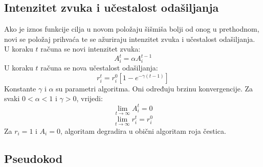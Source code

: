\subsection{Intenzitet zvuka i učestalost odašiljanja}
\hspace{\parindent}Ako je iznos funkcije cilja u novom položaju šišmiša bolji od onog u prethodnom, novi se  položaj prihvaća te se ažuriraju intenzitet zvuka i učestalost odašiljanja.
U koraku $t$ računa se novi intenzitet zvuka:
\begin{equation}
	A_i^{t} = \alpha A_i^{t - 1}
\end{equation}
U koraku $t$ računa se nova učestalost odašiljanja:
\begin{equation}
	r_i^{t} = r_i^{0}[1 - e^{-\gamma(t-1)}]
\end{equation}
Konstante $\gamma$ i $\alpha$ su parametri algoritma. Oni određuju brzinu konvergencije. Za svaki $ 0 < \alpha < 1$ i $\gamma > 0$, vrijedi:
\begin{equation}
	\lim_{t \to \infty} A_i^{t} = 0
\end{equation}
\begin{equation}
	\lim_{t \to \infty} r_i^{t} = r_i^{0}
\end{equation}
Za $r_i = 1$ i $A_i = 0$, algoritam degradira u obični algoritam roja čestica.






\subsection{Pseudokod}

